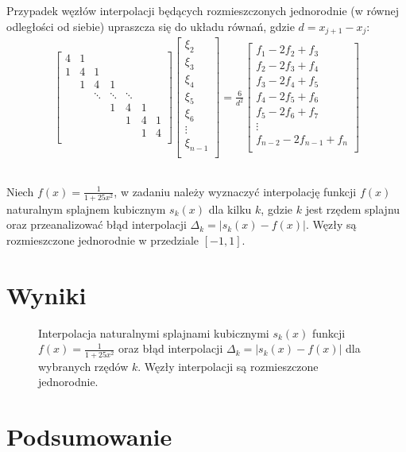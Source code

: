 \documentclass[11pt]{extarticle}
\begin{document}
	Przypadek węzłów interpolacji będących rozmieszczonych jednorodnie (w równej odległości od siebie) upraszcza się do układu równań, gdzie \(d = x_{j+1} - x_j\):
	\begin{align}
		\begin{bmatrix}
			4 & 1 \\
			1 & 4 & 1 \\
			& 1 & 4 & 1 \\
			&& \ddots & \ddots & \ddots \\
			&&& 1 & 4 & 1 \\
			&&&& 1 & 4 & 1 \\
			&&&&& 1 & 4 \\
		\end{bmatrix}
		\begin{bmatrix}
			\xi_2 \\
			\xi_3 \\
			\xi_4 \\
			\xi_5 \\
			\xi_6 \\
			\vdots \\
			\xi_{n-1} \\
		\end{bmatrix} = \frac{6}{d^2} 
		\begin{bmatrix}
			f_1 - 2f_2 + f_3 \\
			f_2 - 2f_3 + f_4 \\
			f_3 - 2f_4 + f_5 \\
			f_4 - 2f_5 + f_6 \\
			f_5 - 2f_6 + f_7 \\
			\vdots \\
			f_{n-2} - 2f_{n-1} + f_{n} \\
		\end{bmatrix}
	\end{align}

	\subsection{}
	Niech \(f(x) = \frac{1}{1+25x^2}\), w zadaniu należy wyznaczyć interpolację funkcji \(f(x)\) naturalnym splajnem kubicznym \(s_k(x)\) dla kilku \(k\), gdzie \(k\) jest rzędem splajnu oraz przeanalizować błąd interpolacji \(\Delta_k = |s_k(x) - f(x)|\).
	Węzły są rozmieszczone jednorodnie w przedziale \([-1, 1]\).
	
	\section{Wyniki}
	\begin{figure}[H]
		\begin{center}
			
		\end{center}
		\caption{Interpolacja naturalnymi splajnami kubicznymi \(s_k(x)\) funkcji \( f(x)=\frac{1}{1+25x^2} \) oraz błąd interpolacji \(\Delta_k = |s_k(x) - f(x)|\) dla wybranych rzędów \(k\). Węzły interpolacji są rozmieszczone jednorodnie.}
		\label{f1u}
	\end{figure}
	
	\section{Podsumowanie}
	
\end{document}
